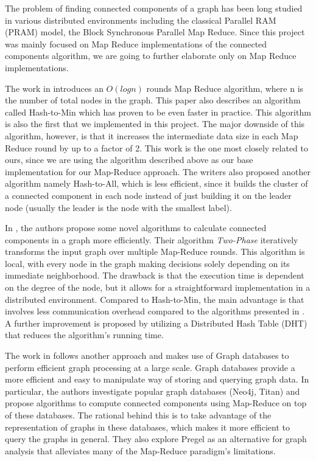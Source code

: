 The problem of finding connected components of a graph has been long studied in various distributed environments including the classical Parallel RAM (PRAM) model, the Block Synchronous Parallel Map Reduce. Since this project was mainly focused on Map Reduce implementations of the connected components algorithm, we are going to further elaborate only on Map Reduce implementations.

The work in \cite{rastogi} introduces an $O(logn)$ rounds Map Reduce algorithm, where n is the number of total nodes in the graph. This paper also describes an algorithm called Hash-to-Min which has proven to be even faster in practice. This algorithm is also the first that we implemented in this project. The major downside of this algorithm, however, is that it increases the intermediate data size in each Map Reduce round by up to a factor of 2. This work is the one most closely related to ours, since we are using the algorithm described above as our base implementation for our Map-Reduce approach. The writers also proposed another algorithm namely Hash-to-All, which is less efficient, since it builds the cluster of a connected component in each node instead of just building it on the leader node (usually the leader is the node with the smallest label).

In \cite{kiveris}, the authors propose some novel algorithms to calculate connected components in a graph more efficiently. Their algorithm \textit{Two-Phase} iteratively transforms the input graph over multiple Map-Reduce rounds. This algorithm is local, with every node in the graph making decisions solely depending on its immediate neighborhood. The drawback is that the execution time is dependent on the degree of the node, but it allows for a straightforward implementation in a distributed environment. Compared to Hash-to-Min, the main advantage is that involves less communication overhead compared to the algorithms presented in \cite{rastogi}. A further improvement is proposed by utilizing a Distributed Hash Table (\ie DHT) that reduces the algorithm's running time. 

The work in \cite{lim2015} follows another approach and makes use of Graph databases to perform efficient graph processing at a large scale. Graph databases provide a more efficient and easy to manipulate way of storing and querying graph data. In particular, the authors investigate popular graph databases (Neo4j, Titan) and propose algorithms to compute connected components using Map-Reduce on top of these databases. The rational behind this is to take advantage of the representation of graphs in these databases, which makes it more efficient to query the graphs in general. They also explore Pregel \cite{pregel} as an alternative for graph analysis that alleviates many of the Map-Reduce paradigm's limitations.